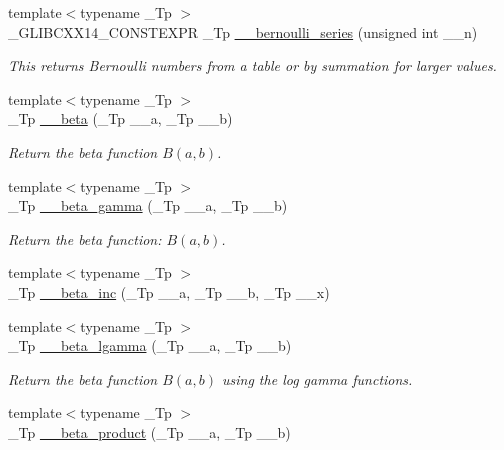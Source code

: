 \begin{DoxyCompactItemize}
{\footnotesize template$<$typename \+\_\+\+Tp $>$ }\\\+\_\+\+G\+L\+I\+B\+C\+X\+X14\+\_\+\+C\+O\+N\+S\+T\+E\+X\+PR \+\_\+\+Tp \hyperlink{namespacestd_1_1____detail_ad3d3e44d340742b0362a8ad95080d315}{\+\_\+\+\_\+bernoulli\+\_\+series} (unsigned int \+\_\+\+\_\+n)
\begin{DoxyCompactList}\small\item\em This returns Bernoulli numbers from a table or by summation for larger values. \end{DoxyCompactList}\item 
{\footnotesize template$<$typename \+\_\+\+Tp $>$ }\\\+\_\+\+Tp \hyperlink{namespacestd_1_1____detail_a090d2f0920e0d208c467609b2a81d717}{\+\_\+\+\_\+beta} (\+\_\+\+Tp \+\_\+\+\_\+a, \+\_\+\+Tp \+\_\+\+\_\+b)
\begin{DoxyCompactList}\small\item\em Return the beta function $ B(a,b) $. \end{DoxyCompactList}\item 
{\footnotesize template$<$typename \+\_\+\+Tp $>$ }\\\+\_\+\+Tp \hyperlink{namespacestd_1_1____detail_a93cfa67cc3f14564925ed3153e055cd1}{\+\_\+\+\_\+beta\+\_\+gamma} (\+\_\+\+Tp \+\_\+\+\_\+a, \+\_\+\+Tp \+\_\+\+\_\+b)
\begin{DoxyCompactList}\small\item\em Return the beta function\+: $ B(a,b) $. \end{DoxyCompactList}\item 
{\footnotesize template$<$typename \+\_\+\+Tp $>$ }\\\+\_\+\+Tp \hyperlink{namespacestd_1_1____detail_aedfe43a9c0065cc3883df50536a625e4}{\+\_\+\+\_\+beta\+\_\+inc} (\+\_\+\+Tp \+\_\+\+\_\+a, \+\_\+\+Tp \+\_\+\+\_\+b, \+\_\+\+Tp \+\_\+\+\_\+x)
\item 
{\footnotesize template$<$typename \+\_\+\+Tp $>$ }\\\+\_\+\+Tp \hyperlink{namespacestd_1_1____detail_ac4f233100713779d93e4eee7665bd0a5}{\+\_\+\+\_\+beta\+\_\+lgamma} (\+\_\+\+Tp \+\_\+\+\_\+a, \+\_\+\+Tp \+\_\+\+\_\+b)
\begin{DoxyCompactList}\small\item\em Return the beta function $B(a,b)$ using the log gamma functions. \end{DoxyCompactList}\item 
{\footnotesize template$<$typename \+\_\+\+Tp $>$ }\\\+\_\+\+Tp \hyperlink{namespacestd_1_1____detail_a9baa688a27befab7fa48ccfb4a87a9ca}{\+\_\+\+\_\+beta\+\_\+product} (\+\_\+\+Tp \+\_\+\+\_\+a, \+\_\+\+Tp \+\_\+\+\_\+b)

\end{DoxyCompactItemize}
